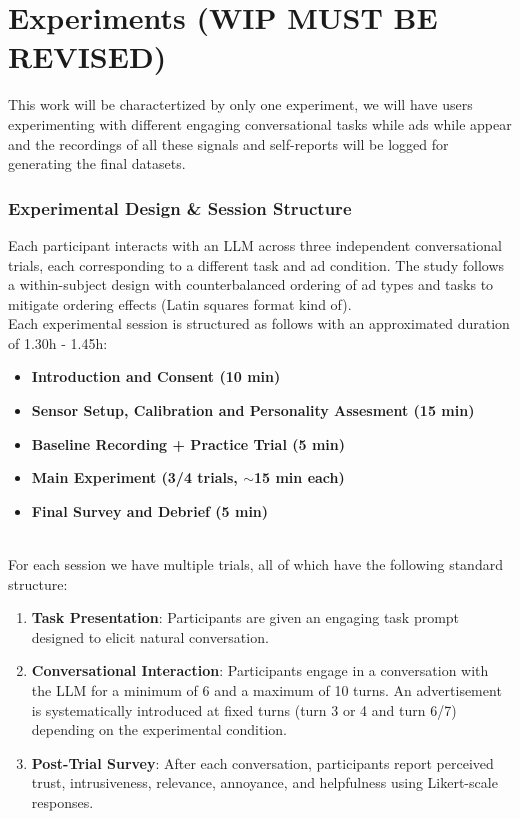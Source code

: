 \documentclass{article}
\begin{document}
\newpage

\section{Experiments (WIP MUST BE REVISED)}

This work will be charactertized by only one experiment, we will have users experimenting with different engaging conversational tasks while ads while appear and the recordings of all these signals and self-reports will be logged for generating the final datasets.

\subsubsection{Experimental Design \& Session Structure}

Each participant interacts with an LLM across three independent conversational trials, each corresponding to a different task and ad condition. The study follows a within-subject design with counterbalanced ordering of ad types and tasks to mitigate ordering effects (Latin squares format kind of).
\\ 

Each experimental session is structured as follows with an approximated duration of 1.30h - 1.45h:

\begin{itemize}
    \item \textbf{Introduction and Consent (10 min)}
    \item \textbf{Sensor Setup, Calibration and Personality Assesment (15 min)}
    \item \textbf{Baseline Recording + Practice Trial (5 min)}
    \item \textbf{Main Experiment (3/4 trials, $\sim$15 min each)}
    \item \textbf{Final Survey and Debrief (5 min)}
\end{itemize}
\\ 

For each session we have multiple trials, all of which have the following standard structure:
\\ 

\begin{enumerate}
    \item \textbf{Task Presentation}: Participants are given an engaging task prompt designed to elicit natural conversation.

    \item \textbf{Conversational Interaction}: Participants engage in a conversation with the LLM for a minimum of 6 and a maximum of 10 turns. An advertisement is systematically introduced at fixed turns (turn 3 or 4 and turn 6/7) depending on the experimental condition.

    \item \textbf{Post-Trial Survey}: After each conversation, participants report perceived trust, intrusiveness, relevance, annoyance, and helpfulness using Likert-scale responses.
\end{enumerate}
\end{document}
